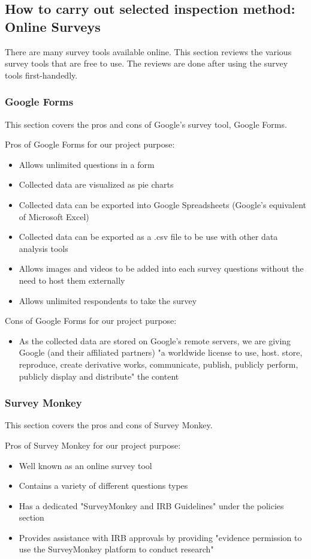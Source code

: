 \documentclass[10pt,journal,compsoc,draftclsnofoot]{IEEEtran}
\begin{document}
\newpage

\subsection{How to carry out selected inspection method: Online Surveys}
There are many survey tools available online.
This section reviews the various survey tools that are free to use.
The reviews are done after using the survey tools first-handedly.

\subsubsection{Google Forms}
This section covers the pros and cons of Google's survey tool, Google Forms.

Pros of Google Forms for our project purpose:
\begin{itemize}
\item Allows unlimited questions in a form
\item Collected data are visualized as pie charts
\item Collected data can be exported into Google Spreadsheets (Google's equivalent of Microsoft Excel)
\item Collected data can be exported as a .csv file to be use with other data analysis tools
\item Allows images and videos to be added into each survey questions without the need to host them externally
\item Allows unlimited respondents to take the survey
\end{itemize}

Cons of Google Forms for our project purpose:
\begin{itemize}
\item As the collected data are stored on Google's remote servers, we are giving Google (and their affiliated partners) "a worldwide license to use, host. store, reproduce, create derivative works, communicate, publish, publicly perform, publicly display and distribute" the content \cite{google}
\end{itemize}

\subsubsection{Survey Monkey}
This section covers the pros and cons of Survey Monkey.

Pros of Survey Monkey for our project purpose:
\begin{itemize}
\item Well known as an online survey tool
\item Contains a variety of different questions types
\item Has a dedicated "SurveyMonkey and IRB Guidelines" under the policies section
\item Provides assistance with IRB approvals by providing "evidence permission to use the SurveyMonkey platform to conduct research" \cite{surveymonkey}
\end{itemize}
\end{document}
